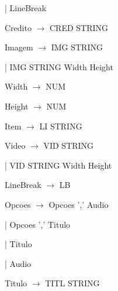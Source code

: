 \documentclass[11pt,a4paper]{report}
\begin{document}
\vspace{0.2cm}
\hspace{2.2cm} | LineBreak

\vspace{0.2cm}
\hspace{1.0cm} Credito $\rightarrow$ CRED STRING

\vspace{0.2cm}
\hspace{1.0cm} Imagem $\rightarrow$ IMG STRING

\vspace{0.2cm}
\hspace{2.65cm} | IMG STRING Width Height

\vspace{0.2cm}
\hspace{1.0cm} Width $\rightarrow$ NUM

\vspace{0.2cm}
\hspace{1.0cm} Height $\rightarrow$ NUM

\vspace{0.2cm}
\hspace{1.0cm} Item $\rightarrow$ LI STRING

\vspace{0.2cm}
\hspace{1.0cm} Video $\rightarrow$ VID STRING

\vspace{0.2cm}
\hspace{2.3cm} | VID STRING Width Height

\vspace{0.2cm}
\hspace{1.0cm} LineBreak $\rightarrow$ LB

\vspace{0.2cm}
\hspace{1.0cm} Opcoes $\rightarrow$ Opcoes ',' Audio

\vspace{0.2cm}
\hspace{2.6cm} | Opcoes ',' Titulo

\vspace{0.2cm}
\hspace{2.6cm} | Titulo

\vspace{0.2cm}
\hspace{2.6cm} | Audio

\vspace{0.2cm}
\hspace{1.0cm} Titulo $\rightarrow$ TITL STRING
\end{document}

